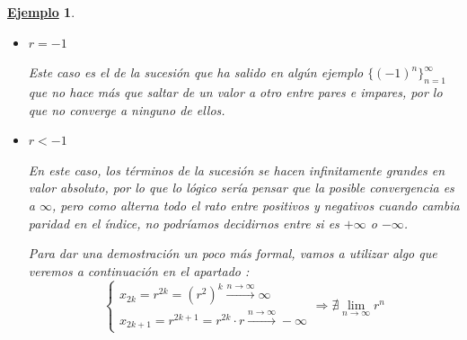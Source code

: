 \documentclass[10pt,a4paper,openright]{book}
\theoremstyle{break}
\newtheorem{ej}{\underline{Ejemplo}}[chapter]
\begin{document}
\begin{ej}
\begin{itemize}
\item $r=-1$

Este caso es el de la sucesión que ha salido en algún ejemplo $\{(-1)^n\}_{n=1}^\infty$ que no hace más que saltar de un valor a otro entre pares e impares, por lo que no converge a ninguno de ellos.

\item $r<-1$

En este caso, los términos de la sucesión se hacen infinitamente grandes en valor absoluto, por lo que lo lógico sería pensar que la posible convergencia es a $\infty$, pero como alterna todo el rato entre positivos y negativos cuando cambia paridad en el índice, no podríamos decidirnos entre si es $+\infty$ o $-\infty$.

Para dar una demostración un poco más formal, vamos a utilizar algo que veremos a continuación en el apartado :
\[
\begin{cases}x_{2k}=r^{2k}=(r^2)^k\stackrel{n\rightarrow \infty}{\rightarrow} \infty \\
x_{2k+1}=r^{2k+1}=r^{2k}\cdot r \stackrel{n\rightarrow \infty}{\rightarrow} -\infty\end{cases}\Rightarrow \nexists \lim_{n\rightarrow\infty} r^n
\]
\end{itemize}
\end{ej}
\end{document}
